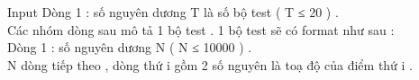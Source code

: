 Input
Dòng 1 : số nguyên dương T là số bộ test ( T ≤ 20 ) .   
\\   Các nhóm dòng sau mô tả 1 bộ test . 1 bộ test sẽ có format như sau :   
\\   Dòng 1 : số nguyên dương N (  N ≤ 10000 ) .   
\\   N dòng tiếp theo , dòng thứ i gồm 2 số nguyên là toạ độ của điểm thứ i .